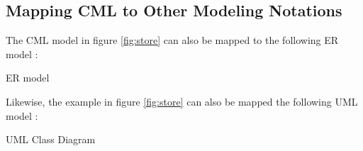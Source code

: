 \subsection{Mapping CML to Other Modeling Notations}\label{subsec:mapping}

The CML model in figure \ref{fig:store} can also be mapped to the following ER model \cite{er}:

{ER model}

Likewise, the example in figure \ref{fig:store} can also be mapped the following UML model \cite{uml}:

{UML Class Diagram}
